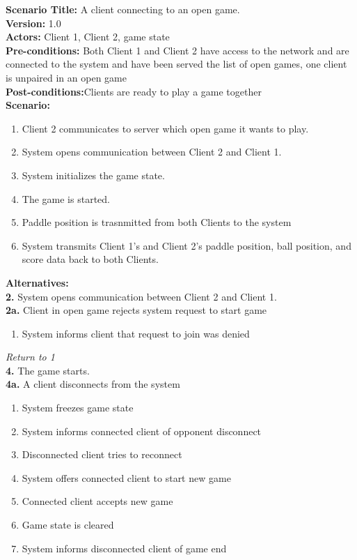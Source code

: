 \documentclass[letterpaper,12pt]{article}
\begin{document}
\noindent \textbf{Scenario Title:} A client connecting to an open game.\\
\textbf{Version:} 1.0\\
\textbf{Actors:} Client 1, Client 2, game state\\
\textbf{Pre-conditions:} Both Client 1 and Client 2 have access to the network and are connected to the system and have been served the list of open games, one client is unpaired in an open game\\
\textbf{Post-conditions:}Clients are ready to play a game together\\
\textbf{Scenario:}
\begin{enumerate}
\item Client 2 communicates to server which open game it wants to play.
\item System opens communication between Client 2 and Client 1.
\item System initializes the game state.
\item The game is started.
\item Paddle position is trasnmitted from both Clients to the system
\item System transmits Client 1's and Client 2's paddle position, ball position, and score data back to both Clients.
\end{enumerate}
\textbf{Alternatives:}\\
\textbf{2.} System opens communication between Client 2 and Client 1.\\
\textbf{2a.} Client in open game rejects system request to start game 
\begin{enumerate}
\item System informs client that request to join was denied
\end{enumerate}
\emph{Return to 1}\\
\textbf{4.} The game starts.\\
\textbf{4a.} A client disconnects from the system
\begin{enumerate}
\item System freezes game state
\item System informs connected client of opponent disconnect
\item Disconnected client tries to reconnect
\item System offers connected client to start new game
\item Connected client accepts new game
\item Game state is cleared
\item System informs disconnected client of game end
\end{enumerate}
\end{document}
